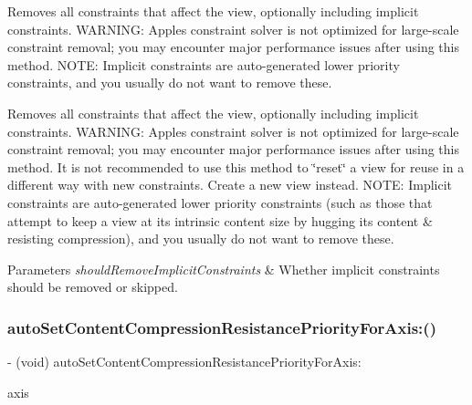 Removes all constraints that affect the view, optionally including implicit constraints. W\+A\+R\+N\+I\+NG\+: Apple\textquotesingle{}s constraint solver is not optimized for large-\/scale constraint removal; you may encounter major performance issues after using this method. N\+O\+TE\+: Implicit constraints are auto-\/generated lower priority constraints, and you usually do not want to remove these.

Removes all constraints that affect the view, optionally including implicit constraints. W\+A\+R\+N\+I\+NG\+: Apple\textquotesingle{}s constraint solver is not optimized for large-\/scale constraint removal; you may encounter major performance issues after using this method. It is not recommended to use this method to \char`\"{}reset\char`\"{} a view for reuse in a different way with new constraints. Create a new view instead. N\+O\+TE\+: Implicit constraints are auto-\/generated lower priority constraints (such as those that attempt to keep a view at its intrinsic content size by hugging its content \& resisting compression), and you usually do not want to remove these.


\begin{DoxyParams}{Parameters}
{\em should\+Remove\+Implicit\+Constraints} & Whether implicit constraints should be removed or skipped. \\
\hline
\end{DoxyParams}
\mbox{\label{category_u_i_view_07_auto_layout_08_ada65b7dbf7477a964be23132ab10759e}} 
\subsubsection{\texorpdfstring{auto\+Set\+Content\+Compression\+Resistance\+Priority\+For\+Axis\+:()}{autoSetContentCompressionResistancePriorityForAxis:()}}
{\footnotesize\ttfamily -\/ (void) auto\+Set\+Content\+Compression\+Resistance\+Priority\+For\+Axis\+: \begin{DoxyParamCaption}\item[{(A\+L\+Axis)}]{axis }\end{DoxyParamCaption}}

